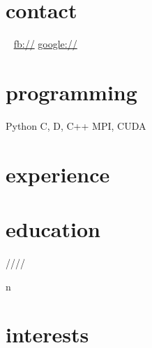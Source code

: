 \documentclass[]{fancy-cv}
\begin{document}

\begin{aside}
  \section{contact}
    \myphone
    \myaddress
    \mycity
    ~
    \href{mailto:\myemail}{\myemail}
    \href{\mywebsite}{\mywebsite}
    \href{http://facebook.com/\myfb}{fb://\myfb}
    \href{http://plug.google.com/\mygp}{google://\mygp}
  \section{programming}
    Python
    C, D, C++
    MPI, CUDA
\end{aside}

\section{experience}
\label{sec:experience}


\vspace{-1.5em}

\section{education}
\label{sec:education}

\begin{entrylist}
 \year/\degree/\school/\city/\subtitle in \education {
  \entry{\year}{\degree}{\school}{\subtitle}
}
\end{entrylist}

\section{interests}
\MakeLowercase\interests
\end{document}
